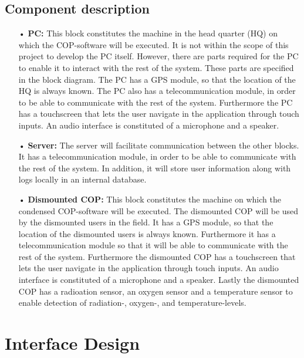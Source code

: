 \subsection{Component description}
\begin{enumerate}
\item[•] \textbf{PC:} This block constitutes the machine in the head quarter (HQ) on which the COP-software will be executed. It is not within the scope of this project to develop the PC itself. However, there are parts required for the PC to enable it to interact with the rest of the system. These parts are specified in the block diagram. The PC has a GPS module, so that the location of the HQ is always known. The PC also has a telecommunication module, in order to be able to communicate with the rest of the system. Furthermore the PC has a touchscreen that lets the user navigate in the application through touch inputs. An audio interface is constituted of a microphone and a speaker.
\item[•] \textbf{Server:} The server will facilitate communication between the other blocks. It has a telecommunication module, in order to be able to communicate with the rest of the system. In addition, it will store user information along with logs locally in an internal database.
\item[•] \textbf{Dismounted COP:} This block constitutes the machine on which the condensed COP-software will be executed. The dismounted COP will be used by the dismounted users in the field. It has a GPS module, so that the location of the dismounted users is always known. Furthermore it has a telecommunication module so that it will be able to communicate with the rest of the system. Furthermore the dismounted COP has a touchscreen that lets the user navigate in the application through touch inputs. An audio interface is constituted of a microphone and a speaker. Lastly the dismounted COP has a radioation sensor, an oxygen sensor and a temperature sensor to enable detection of radiation-, oxygen-, and temperature-levels. 
\end{enumerate}



\section{Interface Design}

